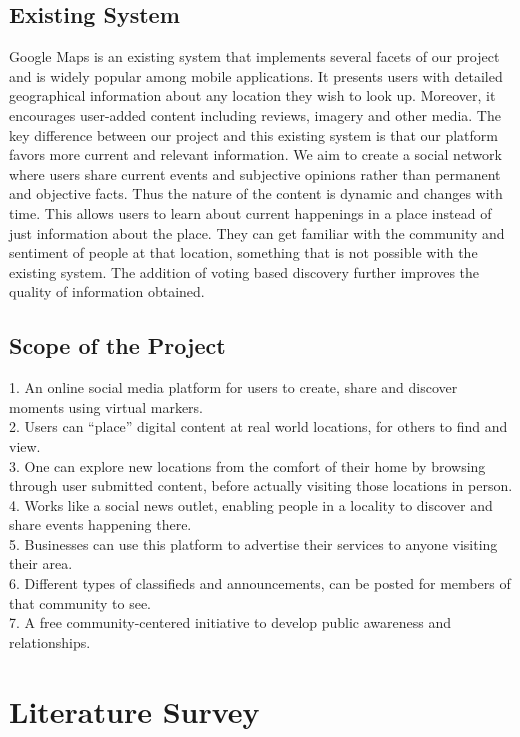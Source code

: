 \section{Existing System}
Google Maps is an existing system that implements several facets of our project and is widely popular among mobile applications. It presents users with detailed geographical information about any location they wish to look up. Moreover, it encourages user-added content including reviews, imagery and other media.
The key difference between our project and this existing system is that our platform favors more current and relevant information. We aim to create a social network where users share current events and subjective opinions rather than permanent and objective facts. Thus the nature of the content is dynamic and changes with time.
This allows users to learn about current happenings in a place instead of just information about the place. They can get familiar with the community and sentiment of people at that location, something that is not possible with the existing system. The addition of voting based discovery further improves the quality of information obtained.


\section{Scope of the Project}
1. An online social media platform for users to create, share and discover moments using virtual
markers.\\
2. Users can ``place'' digital content at real world locations, for others to find and view.\\
3. One can explore new locations from the comfort of their home by browsing through user
submitted content, before actually visiting those locations in person.\\
4. Works like a social news outlet, enabling people in a locality to discover and share
events happening there.\\
5. Businesses can use this platform to advertise their services to anyone visiting their area.\\
6. Different types of classifieds and announcements, can be posted for members of that
community to see.\\
7. A free community-centered initiative to develop public awareness and
relationships.

\chapter{Literature Survey}
